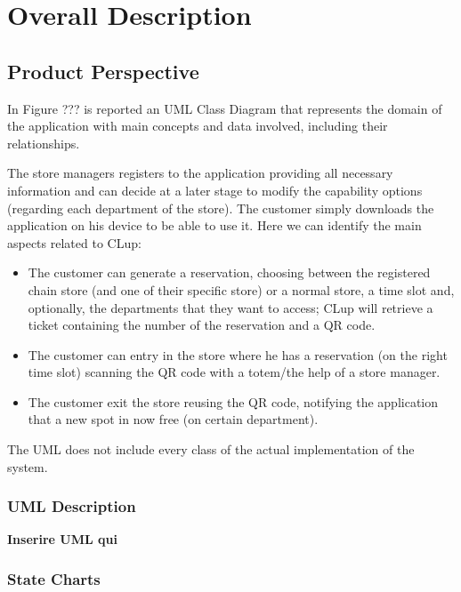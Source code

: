 \documentclass{article}
\begin{document}
	

\section{Overall Description}

	\subsection{Product Perspective}
	
	In Figure ??? is reported an UML Class Diagram that represents the domain of the application with main concepts and data involved, including their relationships.
	
	The store managers registers to the application providing all necessary information and can decide at a later stage to modify the capability options (regarding each department of the store). The customer simply downloads the application on his device to be able to use it. Here we can identify the main aspects related to CLup:
	
	\begin{itemize}
		
		\item The customer can generate a reservation, choosing between the registered chain store (and one of their specific store) or a normal store, a time slot and, optionally, the departments that they want to access; CLup will retrieve a ticket containing the number of the reservation and a QR code.
		
		\item The customer can entry in the store where he has a reservation (on the right time slot) scanning the QR code with a totem/the help of a store manager.
		
		\item The customer exit the store reusing the QR code, notifying the application that a new spot in now free (on certain department).
		
	\end{itemize}
	
	The UML does not include every class of the actual implementation of the system.
	
		\subsubsection{UML Description}

		{\bfseries Inserire UML qui}
		
		\subsubsection{State Charts}
		
\end{document}
